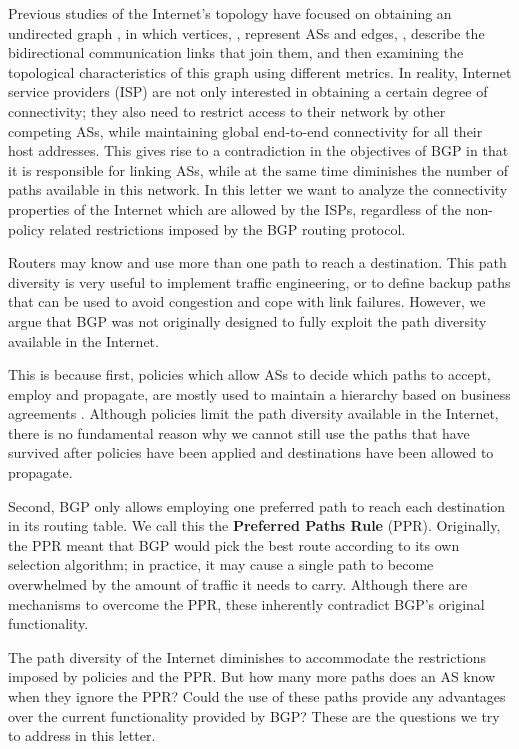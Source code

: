 \documentclass[10pt,final,journal]{IEEEtran}
\begin{document}
Previous studies of the Internet's topology \cite{Mahadevan2006} have focused on obtaining an undirected graph , in which vertices, , represent ASs and edges, , describe the bidirectional communication links that join them, and then examining the topological characteristics of this graph using different metrics. In reality, Internet service providers (ISP) are not only interested in obtaining a certain degree of connectivity; they also need to restrict access to their network by other competing ASs, while maintaining global end-to-end connectivity for all their host addresses. This gives rise to a contradiction in the objectives of BGP in that it is responsible for linking ASs, while at the same time diminishes the number of paths available in this network. In this letter we want to analyze the connectivity properties of the Internet which are allowed by the ISPs, regardless of the non-policy related restrictions imposed by the BGP routing protocol.

Routers may know and use more than one path to reach a destination. This path diversity is very useful to implement traffic engineering, or to define backup paths that can be used to avoid congestion and cope with link failures. However, we argue that BGP was not originally designed to fully exploit the path diversity available in the Internet.

This is because first, policies which allow ASs to decide which paths to accept, employ and propagate, are mostly used to maintain a hierarchy based on business agreements \cite{Gao2000a}. Although policies limit the path diversity available in the Internet, there is no fundamental reason why we cannot still use the paths that have survived after policies have been applied and destinations have been allowed to propagate.

Second, BGP only allows employing one preferred path to reach each destination in its routing table. We call this the \textbf{Preferred Paths Rule} (PPR). Originally, the PPR meant that BGP would pick the best route according to its own selection algorithm; in practice, it may cause a single path to become overwhelmed by the amount of traffic it needs to carry. Although there are mechanisms to overcome the PPR, these inherently contradict BGP's original functionality.

The path diversity of the Internet diminishes to accommodate the restrictions imposed by policies and the PPR. But how many more paths does an AS know when they ignore the PPR? Could the use of these paths provide any advantages over the current functionality provided by BGP? These are the questions we try to address in this letter.
\end{document}
